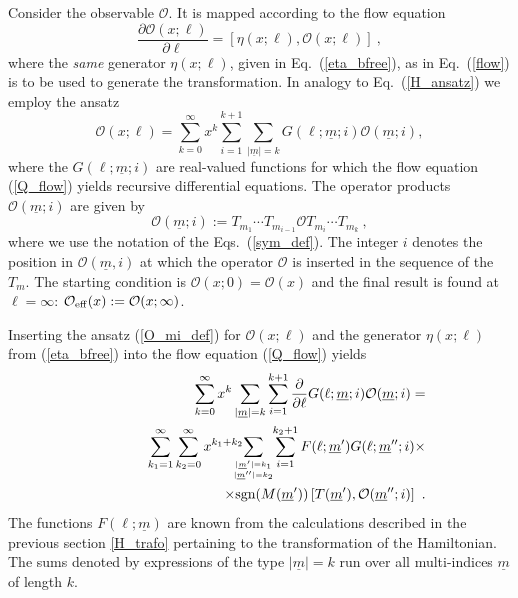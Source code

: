 Consider the observable ${\mathcal O}$.  It is mapped according
to the flow equation 
\begin{equation}
  \label{Q_flow}
  \frac{\partial {\mathcal O}(x;\ell)}{\partial
  \ell}=[\eta(x;\ell),{\mathcal O}(x;\ell)]\ ,
\end{equation}
where the {\it same} generator $\eta(x;\ell)$, given in
Eq.\ (\ref{eta_bfree}), as in Eq.~(\ref{flow})
is to be used  to generate the transformation. 
 In analogy to Eq.~(\ref{H_ansatz}) we employ the ansatz 
\begin{equation}
  \label{O_ansatz}
  {\mathcal O}(x;\ell)=\sum_{k=0}^{\infty}x^k\sum_{i=1}^{k+1}
  \sum_{|\underline{m}|=k}G(\ell;\underline{m};i){\mathcal
  O}(\underline{m};i) ,
\end{equation}
where the $G(\ell;\underline{m};i)$ are real-valued functions for
which the flow equation (\ref{Q_flow}) yields recursive
differential equations. The operator products
${\mathcal O}(\underline{m};i)$ are given by
\begin{equation}
  \label{O_mi_def}
  {\mathcal O}(\underline{m};i):=T_{m_1}\cdots T_{m_{i-1}} {\mathcal O}
T_{m_{i}} \cdots T_{m_{k}}\ ,
\end{equation}
where we use the notation of the Eqs.~(\ref{sym_def}).
 The integer $i$ denotes the position in
${\mathcal O}({\underline m},i)$ at which the operator ${\mathcal O}$
is inserted in the sequence of the $T_m$. The starting condition
is ${\mathcal O}(x;0)= {\mathcal O}(x)$ and the final result is found at
$\ell=\infty$: ${\mathcal O}_{\rm eff}(x):={\mathcal O}(x;\infty)$.  

Inserting the ansatz (\ref{O_mi_def}) for ${\mathcal O}(x;\ell)$  and the 
generator $\eta(x;\ell)$ from (\ref{eta_bfree}) into
 the flow equation (\ref{Q_flow}) yields
\begin{eqnarray}
  \nonumber
  &&\sum_{k=0}^{\infty}x^k\sum_{|{\underline m}|=k}\sum_{i=1}^{k+1}
  \frac{\partial}{\partial \ell}G(\ell;{\underline m};i) {\mathcal
    O}({\underline m};i)=\\\nonumber
  &&\hspace*{10mm} \sum_{k_1=1}^{\infty}\sum_{k_2=0}^{\infty}x^{k_1+k_2}\!\!\!\!\!\!
  \sum_{|{\underline 
  m}'|=k_1 \atop |{\underline m}''|=k_2}\!\!\sum_{i=1}^{k_2+1}
  F(\ell;{\underline m}')G(\ell;{\underline m}'';i)\times\\\label{G_dgl_1}
  && \hspace*{20mm}\times\mbox{sgn}
  (M({\underline m}'))\left[T({\underline m}'),{\mathcal O}
  ({\underline m}'';i)\right]\ .
\end{eqnarray} 
The functions $F(\ell;{\underline m})$ are known from the
calculations described in the previous section \ref{H_trafo}
pertaining to the transformation of the Hamiltonian. 
The  sums denoted by expressions of the type $|\underline m| =k$  run over all
 multi-indices $\underline m$ of length $k$.

